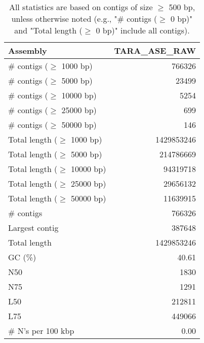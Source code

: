 \documentclass[12pt,a4paper]{article}
\begin{document}
\begin{table}[ht]
\begin{center}
\caption{All statistics are based on contigs of size $\geq$ 500 bp, unless otherwise noted (e.g., "\# contigs ($\geq$ 0 bp)" and "Total length ($\geq$ 0 bp)" include all contigs).}
\begin{tabular}{|l*{1}{|r}|}
\hline
Assembly & TARA\_ASE\_RAW \\ \hline
\# contigs ($\geq$ 1000 bp) & 766326 \\ \hline
\# contigs ($\geq$ 5000 bp) & 23499 \\ \hline
\# contigs ($\geq$ 10000 bp) & 5254 \\ \hline
\# contigs ($\geq$ 25000 bp) & 699 \\ \hline
\# contigs ($\geq$ 50000 bp) & 146 \\ \hline
Total length ($\geq$ 1000 bp) & 1429853246 \\ \hline
Total length ($\geq$ 5000 bp) & 214786669 \\ \hline
Total length ($\geq$ 10000 bp) & 94319718 \\ \hline
Total length ($\geq$ 25000 bp) & 29656132 \\ \hline
Total length ($\geq$ 50000 bp) & 11639915 \\ \hline
\# contigs & 766326 \\ \hline
Largest contig & 387648 \\ \hline
Total length & 1429853246 \\ \hline
GC (\%) & 40.61 \\ \hline
N50 & 1830 \\ \hline
N75 & 1291 \\ \hline
L50 & 212811 \\ \hline
L75 & 449066 \\ \hline
\# N's per 100 kbp & 0.00 \\ \hline
\end{tabular}
\end{center}
\end{table}
\end{document}

